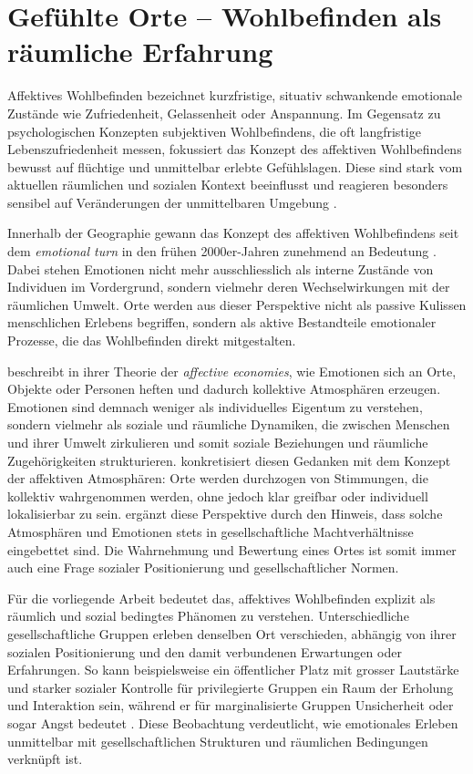 \section{Gefühlte Orte -- Wohlbefinden als räumliche Erfahrung}

Affektives Wohlbefinden bezeichnet kurzfristige, situativ schwankende emotionale Zustände wie Zufriedenheit, Gelassenheit oder Anspannung. Im Gegensatz zu psychologischen Konzepten subjektiven Wohlbefindens, die oft langfristige Lebenszufriedenheit messen, fokussiert das Konzept des affektiven Wohlbefindens bewusst auf flüchtige und unmittelbar erlebte Gefühlslagen. Diese sind stark vom aktuellen räumlichen und sozialen Kontext beeinflusst und reagieren besonders sensibel auf Veränderungen der unmittelbaren Umgebung \parencite{dodgeChallengeDefiningWellbeing2012}.

Innerhalb der Geographie gewann das Konzept des affektiven Wohlbefindens seit dem \emph{emotional turn} in den frühen 2000er-Jahren zunehmend an Bedeutung \parencite{hoSocialGeographyIII2024}. Dabei stehen Emotionen nicht mehr ausschliesslich als interne Zustände von Individuen im Vordergrund, sondern vielmehr deren Wechselwirkungen mit der räumlichen Umwelt. Orte werden aus dieser Perspektive nicht als passive Kulissen menschlichen Erlebens begriffen, sondern als aktive Bestandteile emotionaler Prozesse, die das Wohlbefinden direkt mitgestalten.

\textcite{ahmedAffectiveEconomies2004} beschreibt in ihrer Theorie der \emph{affective economies}, wie Emotionen sich an Orte, Objekte oder Personen heften und dadurch kollektive Atmosphären erzeugen. Emotionen sind demnach weniger als individuelles Eigentum zu verstehen, sondern vielmehr als soziale und räumliche Dynamiken, die zwischen Menschen und ihrer Umwelt zirkulieren und somit soziale Beziehungen und räumliche Zugehörigkeiten strukturieren. \textcite{andersonAffectiveAtmospheres2009} konkretisiert diesen Gedanken mit dem Konzept der affektiven Atmosphären: Orte werden durchzogen von Stimmungen, die kollektiv wahrgenommen werden, ohne jedoch klar greifbar oder individuell lokalisierbar zu sein. \textcite{hoSocialGeographyIII2024} ergänzt diese Perspektive durch den Hinweis, dass solche Atmosphären und Emotionen stets in gesellschaftliche Machtverhältnisse eingebettet sind. Die Wahrnehmung und Bewertung eines Ortes ist somit immer auch eine Frage sozialer Positionierung und gesellschaftlicher Normen.

Für die vorliegende Arbeit bedeutet das, affektives Wohlbefinden explizit als räumlich und sozial bedingtes Phänomen zu verstehen. Unterschiedliche gesellschaftliche Gruppen erleben denselben Ort verschieden, abhängig von ihrer sozialen Positionierung und den damit verbundenen Erwartungen oder Erfahrungen. So kann beispielsweise ein öffentlicher Platz mit grosser Lautstärke und starker sozialer Kontrolle für privilegierte Gruppen ein Raum der Erholung und Interaktion sein, während er für marginalisierte Gruppen Unsicherheit oder sogar Angst bedeutet \parencite{collectiveSafeSpaceReconceptualization2014}. Diese Beobachtung verdeutlicht, wie emotionales Erleben unmittelbar mit gesellschaftlichen Strukturen und räumlichen Bedingungen verknüpft ist.

